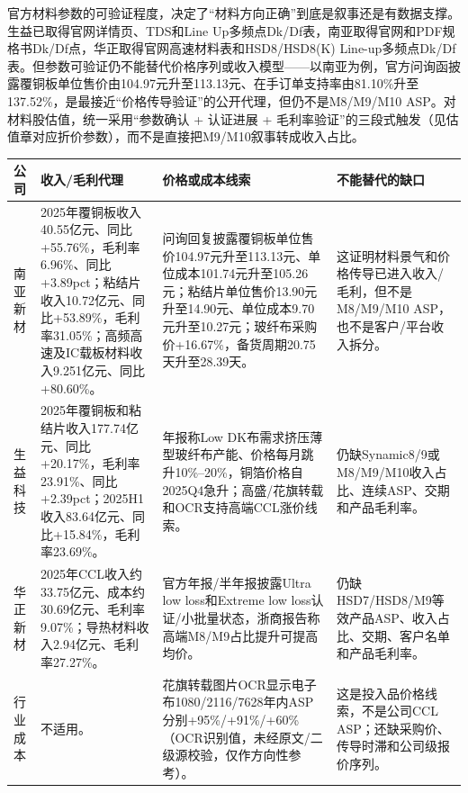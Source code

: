 官方材料参数的可验证程度，决定了“材料方向正确”到底是叙事还是有数据支撑。生益已取得官网详情页、TDS和Line Up多频点Dk/Df表，南亚取得官网和PDF规格书Dk/Df点，华正取得官网高速材料表和HSD8/HSD8(K) Line-up多频点Dk/Df表。但参数可验证仍不能替代价格序列或收入模型——以南亚为例，官方问询函披露覆铜板单位售价由104.97元升至113.13元、在手订单支持率由81.10\%升至137.52\%，是最接近“价格传导验证”的公开代理，但仍不是M8/M9/M10 ASP。对材料股估值，统一采用“参数确认 + 认证进展 + 毛利率验证”的三段式触发（见估值章对应折价参数），而不是直接把M9/M10叙事转成收入占比。

\begin{exhibitbox}[图表3-13：材料收入和毛利代理序列]
\scriptsize
\begin{tabularx}{\textwidth}{L{1.8cm}X X X}
\toprule
\textbf{公司} & \textbf{收入/毛利代理} & \textbf{价格或成本线索} & \textbf{不能替代的缺口} \\
\midrule
南亚新材 & 2025年覆铜板收入40.55亿元、同比+55.76\%，毛利率6.96\%、同比+3.89pct；粘结片收入10.72亿元、同比+53.89\%，毛利率31.05\%；高频高速及IC载板材料收入9.251亿元、同比+80.60\%。 & 问询回复披露覆铜板单位售价104.97元升至113.13元、单位成本101.74元升至105.26元；粘结片单位售价13.90元升至14.90元、单位成本9.70元升至10.27元；玻纤布采购价+16.67\%，备货周期20.75天升至28.39天。 & 这证明材料景气和价格传导已进入收入/毛利，但不是M8/M9/M10 ASP，也不是客户/平台收入拆分。 \\
生益科技 & 2025年覆铜板和粘结片收入177.74亿元、同比+20.17\%，毛利率23.91\%、同比+2.39pct；2025H1收入83.64亿元、同比+15.84\%，毛利率23.69\%。 & 年报称Low DK布需求挤压薄型玻纤布产能、价格每月跳升10\%--20\%，铜箔价格自2025Q4急升；高盛/花旗转载和OCR支持高端CCL涨价线索。 & 仍缺Synamic8/9或M8/M9/M10收入占比、连续ASP、交期和产品毛利率。 \\
华正新材 & 2025年CCL收入约33.75亿元、成本约30.69亿元、毛利率9.07\%；导热材料收入2.94亿元、毛利率27.27\%。 & 官方年报/半年报披露Ultra low loss和Extreme low loss认证/小批量状态，浙商报告称高端M8/M9占比提升可提高均价。 & 仍缺HSD7/HSD8/M9等效产品ASP、收入占比、交期、客户名单和产品毛利率。 \\
行业成本 & 不适用。 & 花旗转载图片OCR显示电子布1080/2116/7628年内ASP分别+95\%/+91\%/+60\%（OCR识别值，未经原文/二级源校验，仅作方向性参考）。 & 这是投入品价格线索，不是公司CCL ASP；还缺采购价、传导时滞和公司级报价序列。 \\
\bottomrule
\end{tabularx}
\end{exhibitbox}

